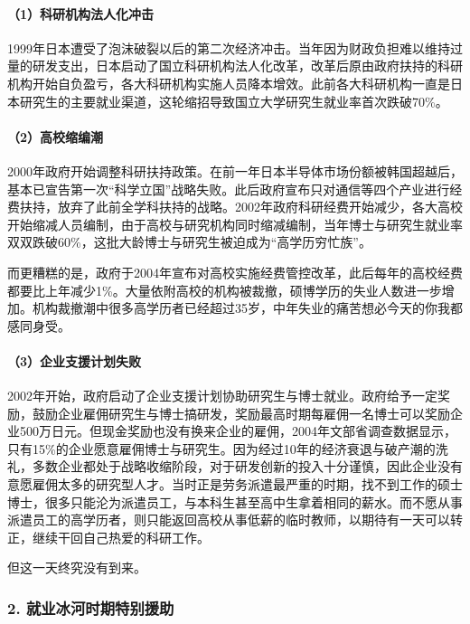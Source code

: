 \paragraph*{（1）科研机构法人化冲击}

1999年日本遭受了泡沫破裂以后的第二次经济冲击。当年因为财政负担难以维持过量的研发支出，日本启动了国立科研机构法人化改革，改革后原由政府扶持的科研机构开始自负盈亏，各大科研机构实施人员降本增效。此前各大科研机构一直是日本研究生的主要就业渠道，这轮缩招导致国立大学研究生就业率首次跌破70\%。

\paragraph*{（2）高校缩编潮}

2000年政府开始调整科研扶持政策。在前一年日本半导体市场份额被韩国超越后，基本已宣告第一次“科学立国”战略失败。此后政府宣布只对通信等四个产业进行经费扶持，放弃了此前全学科扶持的战略。2002年政府科研经费开始减少，各大高校开始缩减人员编制，由于高校与研究机构同时缩减编制，当年博士与研究生就业率双双跌破60\%，这批大龄博士与研究生被迫成为“高学历穷忙族”。

而更糟糕的是，政府于2004年宣布对高校实施经费管控改革，此后每年的高校经费都要比上年减少1\%。大量依附高校的机构被裁撤，硕博学历的失业人数进一步增加。机构裁撤潮中很多高学历者已经超过35岁，中年失业的痛苦想必今天的你我都感同身受。

\paragraph*{（3）企业支援计划失败}

2002年开始，政府启动了企业支援计划协助研究生与博士就业。政府给予一定奖励，鼓励企业雇佣研究生与博士搞研发，奖励最高时期每雇佣一名博士可以奖励企业500万日元。但现金奖励也没有换来企业的雇佣，2004年文部省调查数据显示，只有15\%的企业愿意雇佣博士与研究生。因为经过10年的经济衰退与破产潮的洗礼，多数企业都处于战略收缩阶段，对于研发创新的投入十分谨慎，因此企业没有意愿雇佣太多的研究型人才。当时正是劳务派遣最严重的时期，找不到工作的硕士博士，很多只能沦为派遣员工，与本科生甚至高中生拿着相同的薪水。而不愿从事派遣员工的高学历者，则只能返回高校从事低薪的临时教师，以期待有一天可以转正，继续干回自己热爱的科研工作。

但这一天终究没有到来。

\subsubsection{2. 就业冰河时期特别援助}

